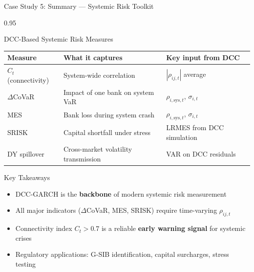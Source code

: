 \documentclass[9pt, aspectratio=169, t]{beamer}
\begin{document}
\begin{frame}{Case Study 5: Summary --- Systemic Risk Toolkit}
    \begin{cminipage}{0.95\textwidth}
    {\footnotesize
    \begin{block}{DCC-Based Systemic Risk Measures}
        \vspace{0.1cm}
        {\small
        \begin{center}
        \begin{tabular}{l|l|l}
            \hline
            \textbf{Measure} & \textbf{What it captures} & \textbf{Key input from DCC} \\
            \hline
            $C_t$ (connectivity) & System-wide correlation & $|\rho_{ij,t}|$ average \\
            $\Delta$CoVaR       & Impact of one bank on system VaR & $\rho_{i,\text{sys},t}$, $\sigma_{i,t}$ \\
            MES                 & Bank loss during system crash & $\rho_{i,\text{sys},t}$, $\sigma_{i,t}$ \\
            SRISK               & Capital shortfall under stress & LRMES from DCC simulation \\
            DY spillover        & Cross-market volatility transmission & VAR on DCC residuals \\
            \hline
        \end{tabular}
        \end{center}
        }
    \end{block}
    \begin{alertblock}{Key Takeaways}
        \begin{itemize}\setlength{\itemsep}{0pt}
            \item DCC-GARCH is the \textbf{backbone} of modern systemic risk measurement
            \item All major indicators ($\Delta$CoVaR, MES, SRISK) require time-varying $\rho_{ij,t}$
            \item Connectivity index $C_t > 0.7$ is a reliable \textbf{early warning signal} for systemic crises
            \item Regulatory applications: G-SIB identification, capital surcharges, stress testing
        \end{itemize}
    \end{alertblock}
    }
    \end{cminipage}
\end{frame}

\end{document}
